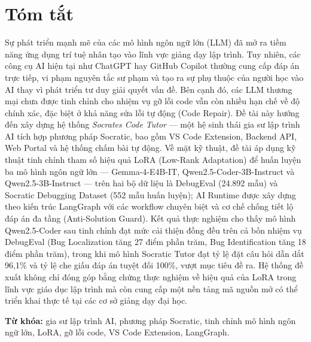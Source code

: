 \chapter*{Tóm tắt}
\label{summary}

Sự phát triển mạnh mẽ của các mô hình ngôn ngữ lớn (LLM) đã mở ra tiềm năng ứng dụng trí tuệ nhân tạo vào lĩnh vực giảng dạy lập trình. Tuy nhiên, các công cụ AI hiện tại như ChatGPT hay GitHub Copilot thường cung cấp đáp án trực tiếp, vi phạm nguyên tắc sư phạm và tạo ra sự phụ thuộc của người học vào AI thay vì phát triển tư duy giải quyết vấn đề. Bên cạnh đó, các LLM thương mại chưa được tinh chỉnh cho nhiệm vụ gỡ lỗi code vẫn còn nhiều hạn chế về độ chính xác, đặc biệt ở khả năng sửa lỗi tự động (Code Repair). Đề tài này hướng đến xây dựng hệ thống \textit{Socrates Code Tutor} --- một hệ sinh thái gia sư lập trình AI tích hợp phương pháp Socratic, bao gồm VS Code Extension, Backend API, Web Portal và hệ thống chấm bài tự động. Về mặt kỹ thuật, đề tài áp dụng kỹ thuật tinh chỉnh tham số hiệu quả LoRA (Low-Rank Adaptation) để huấn luyện ba mô hình ngôn ngữ lớn --- Gemma-4-E4B-IT, Qwen2.5-Coder-3B-Instruct và Qwen2.5-3B-Instruct --- trên hai bộ dữ liệu là DebugEval (24.892 mẫu) và Socratic Debugging Dataset (552 mẫu huấn luyện); AI Runtime được xây dựng theo kiến trúc LangGraph với các workflow chuyên biệt và cơ chế chống tiết lộ đáp án đa tầng (Anti-Solution Guard). Kết quả thực nghiệm cho thấy mô hình Qwen2.5-Coder sau tinh chỉnh đạt mức cải thiện đồng đều trên cả bốn nhiệm vụ DebugEval (Bug Localization tăng 27 điểm phần trăm, Bug Identification tăng 18 điểm phần trăm), trong khi mô hình Socratic Tutor đạt tỷ lệ đặt câu hỏi dẫn dắt 96,1\% và tỷ lệ che giấu đáp án tuyệt đối 100\%, vượt mục tiêu đề ra. Hệ thống đề xuất không chỉ đóng góp bằng chứng thực nghiệm về hiệu quả của LoRA trong lĩnh vực giáo dục lập trình mà còn cung cấp một nền tảng mã nguồn mở có thể triển khai thực tế tại các cơ sở giảng dạy đại học.

\bigskip
\noindent\textbf{Từ khóa:} gia sư lập trình AI, phương pháp Socratic, tinh chỉnh mô hình ngôn ngữ lớn, LoRA, gỡ lỗi code, VS Code Extension, LangGraph.
